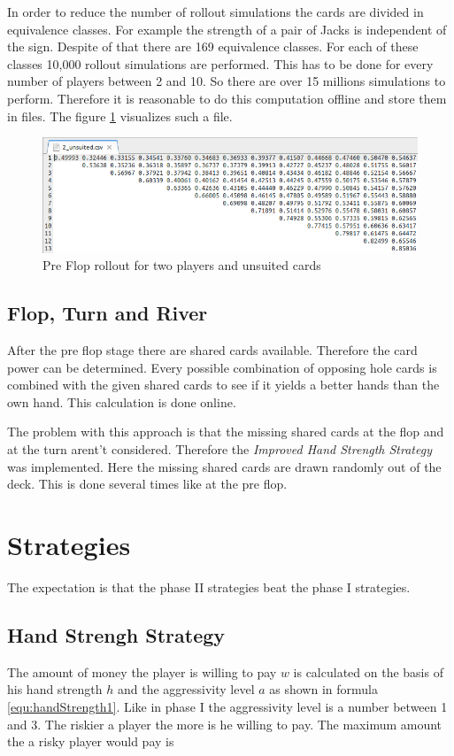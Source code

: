 In order to reduce the number of rollout simulations the cards are divided in equivalence classes. For example the strength of a pair of Jacks is independent of the sign. Despite of that there are 169 equivalence classes. For each of these classes 10,000 rollout simulations are performed. This has to be done for every number of players between 2 and 10. So there are over 15 millions simulations to perform. Therefore it is reasonable to do this computation offline and store them in files. The figure \ref{fig:preflop} visualizes such a file.

\begin{figure}[h]
  \centering
  \includegraphics[width=1.0\textwidth]{images/preflop}
  \caption{Pre Flop rollout for two players and unsuited cards}
  \label{fig:preflop}
\end{figure}

\subsection{Flop, Turn and River}
After the pre flop stage there are shared cards available. Therefore the card power can be determined. Every possible combination of opposing hole cards is combined with the given shared cards to see if it yields a better hands than the own hand. This calculation is done online.

The problem with this approach is that the missing shared cards at the flop and at the turn arent't considered. Therefore the \emph{Improved Hand Strength Strategy} was implemented. Here the missing shared cards are drawn randomly out of the deck. This is done several times like at the pre flop.

\section{Strategies}
The expectation is that the phase II strategies beat the phase I strategies.

\subsection{Hand Strengh Strategy}
The amount of money the player is willing to pay $w$ is calculated on the basis of his hand strength $h$ and the aggressivity level $a$ as shown in formula \ref{equ:handStrength1}. Like in phase I the aggressivity level is a number between 1 and 3. The riskier a player the more is he willing to pay. The maximum amount the a risky player would pay is 

